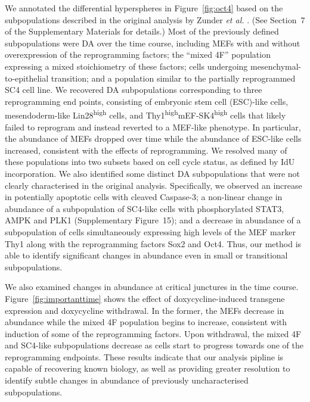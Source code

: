 \documentclass{article}
\newcommand{\suppannotate}{7}
\newcommand{\suppfignonlinear}{15}
\begin{document}
We annotated the differential hyperspheres in Figure~\ref{fig:oct4} based on the subpopulations described in the original analysis by Zunder \emph{et al.} \cite{zunder2015continuous}.
(See Section~\suppannotate{} of the Supplementary Materials for details.)
Most of the previously defined subpopulations were DA over the time course, including MEFs with and without overexpression of the reprogramming factors; 
    the ``mixed 4F'' population expressing a mixed stoichiometry of these factors; 
    cells undergoing mesenchymal-to-epithelial transition; 
    and a population similar to the partially reprogrammed SC4 cell line.
We recovered DA subpopulations corresponding to three reprogramming end points, consisting of embryonic stem cell (ESC)-like cells, mesendoderm-like Lin28\textsuperscript{high} cells, and Thy1\textsuperscript{high}mEF-SK4\textsuperscript{high} cells that likely failed to reprogram and instead reverted to a MEF-like phenotype.
In particular, the abundance of MEFs dropped over time while the abundance of ESC-like cells increased, consistent with the effects of reprogramming.
We resolved many of these populations into two subsets based on cell cycle status, as defined by IdU incorporation.
We also identified some distinct DA subpopulations that were not clearly characterised in the original analysis.
Specifically, we observed an increase in potentially apoptotic cells with cleaved Caspase-3;
    a non-linear change in abundance of a subpopulation of SC4-like cells with phosphorylated STAT3, AMPK and PLK1 (Supplementary Figure~\suppfignonlinear{});
    and a decrease in abundance of a subpopulation of cells simultaneously expressing high levels of the MEF marker Thy1 along with the reprogramming factors Sox2 and Oct4.
Thus, our method is able to identify significant changes in abundance even in small or transitional subpopulations.

We also examined changes in abundance at critical junctures in the time course.
Figure~\ref{fig:importanttime} shows the effect of doxycycline-induced transgene expression and doxycycline withdrawal.
In the former, the MEFs decrease in abundance while the mixed 4F population begins to increase, consistent with induction of some of the reprogramming factors.
Upon withdrawal, the mixed 4F and SC4-like subpopulations decrease as cells start to progress towards one of the reprogramming endpoints.
These results indicate that our analysis pipline is capable of recovering known biology, as well as providing greater resolution to identify subtle changes in abundance of previously uncharacterised subpopulations.
\end{document}
